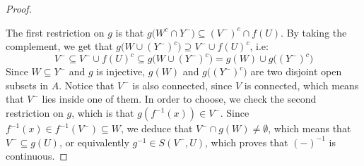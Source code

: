 \begin{proof}
\begin{center}
\end{center}
The first restriction on $g$ is that $g\big(W^c\cap Y^-\big)\subseteq(V^-)^c\cap f(U)$. By taking the complement, we get that $g\big(W\cup(Y^-)^c\big)\supseteq V^-\cup f(U)^c$, i.e:
\[V^-\subseteq V^-\cup f(U)^c\subseteq g\big(W\cup(Y^-)^c\big)=g(W)\cup g\big((Y^-)^c\big) \]
Since $W\subseteq Y^-$ and $g$ is injective, $g(W)$ and $g\big((Y^-)^c\big)$ are two disjoint open subsets in $A$. Notice that $V^-$ is also connected, since $V$ is connected, which means that $V^-$ lies inside one of them. In order to choose, we check the second restriction on $g$, which is that $g(f^{-1}(x))\in V^-$. Since $f^{-1}(x)\in f^{-1}(V^-)\subseteq W$, we deduce that $V^-\cap g(W)\neq\emptyset$, which means that $V^-\subseteq g(U)$, or equivalently $g^{-1}\in S(V^-,U)$, which proves that $(-)^{-1}$ is continuous.
\end{proof}















